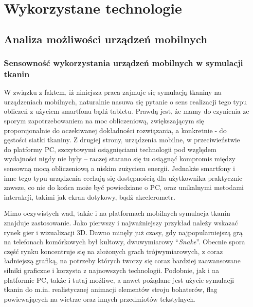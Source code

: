 \chapter{Wykorzystane technologie}
\label{t:technologie}


	\section{Analiza możliwości urządzeń mobilnych}
	\label{t:technologie:mobilne}
	
		\subsection{Sensowność wykorzystania urządzeń mobilnych w symulacji tkanin}
		\label{t:technologie:mobilne:dlaczego}
		
		
		W związku z faktem, iż niniejsza praca zajmuje się symulacją tkaniny na urządzeniach mobilnych, naturalnie nasuwa się pytanie o sens realizacji tego typu obliczeń z użyciem smartfonu bądź tabletu. Prawdą jest, że mamy do czynienia ze sporym zapotrzebowaniem na moc obliczeniową, zwiększającym się proporcjonalnie do oczekiwanej dokładności rozwiązania, a konkretnie - do gęstości siatki tkaniny. Z drugiej strony, urządzenia mobilne, w przeciwieństwie do platformy PC, szczytowymi osiągnięciami technologii pod względem wydajności nigdy nie były -- raczej starano się tu osiągnąć kompromis między sensowną mocą obliczeniową a niskim zużyciem energii. Jednakże smartfony i inne tego typu urządzenia cechują się dostępnością dla użytkownika praktycznie zawsze, co nie do końca może być powiedziane o PC, oraz unikalnymi metodami interakcji, takimi jak ekran dotykowy, bądź akcelerometr.
		
		Mimo oczywistych wad, także i na platformach mobilnych symulacja tkanin znajduje zastosowanie. Jako pierwszy i najważniejszy przykład należy wskazać rynek gier i wizualizacji 3D. Dawno minęły już czasy, gdy najpopularniejszą grą na telefonach komórkowych był kultowy, dwuwymiarowy ``\emph{Snake}''. Obecnie spora część rynku koncentruje się na złożonych grach trójwymiarowych, z coraz ładniejszą grafiką, na potrzeby których tworzy się coraz bardziej zaawansowane silniki graficzne i korzysta z najnowszych technologii. Podobnie, jak i na platformie PC, także i tutaj możliwe, a nawet pożądane jest użycie symulacji tkanin do m.in. realistycznej animacji elementów stroju bohaterów, flag powiewających na wietrze oraz innych przedmiotów tekstylnych.
		
